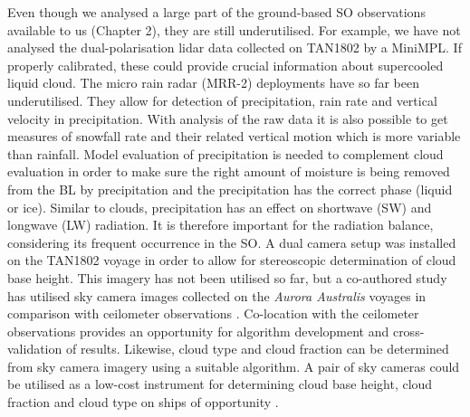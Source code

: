 Even though we analysed a large part of the ground-based SO observations
available to us (Chapter 2), they are still underutilised. For example,
we have not analysed the dual-polarisation lidar data collected on TAN1802
by a MiniMPL. If properly calibrated, these could provide crucial information
about supercooled liquid cloud. The micro rain radar (MRR-2) deployments
have so far been underutilised. They allow for detection of precipitation,
rain rate and vertical velocity in precipitation.
With analysis of the raw data it is also possible to get measures of snowfall
rate and their related vertical motion which is more variable than rainfall.
Model evaluation of
precipitation is needed to complement cloud evaluation in order to make
sure the right amount of moisture is being removed from the BL by precipitation
and the precipitation has the correct phase (liquid or ice). Similar to clouds,
precipitation has an effect on shortwave (SW) and longwave (LW) radiation. It is therefore important
for the radiation balance, considering its frequent occurrence in the SO.
A dual camera setup was installed on the TAN1802 voyage in order to allow
for stereoscopic determination of cloud base height. This imagery has not been
utilised so far, but a co-authored study has utilised sky camera images collected
on the \textit{Aurora Australis} voyages in comparison with
ceilometer observations \citep{klekociuk2020}.
Co-location with the ceilometer observations provides an
opportunity for algorithm development and cross-validation of results.
Likewise, cloud type and cloud fraction can be determined from sky camera
imagery using a suitable algorithm. A pair of sky cameras could be utilised as
a low-cost instrument for determining cloud base height, cloud fraction
and cloud type on ships of opportunity \citep{klekociuk2020}.

